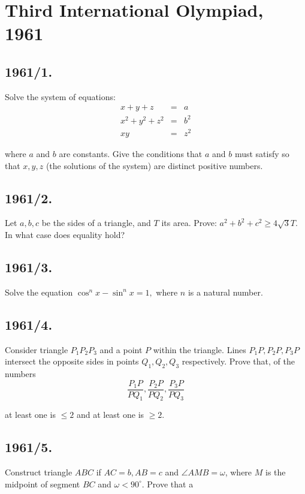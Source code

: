 \documentclass[12pt,thmsa]{article}
\begin{document}
\section{Third International Olympiad, 1961}

\subsection{1961/1.}

Solve the system of equations:
\begin{eqnarray*}
x+y+z &=&a \\
x^{2}+y^{2}+z^{2} &=&b^{2} \\
xy &=&z^{2}
\end{eqnarray*}

where $a$ and $b$ are constants. Give the conditions that $a$ and $b$ must
satisfy so that $x,y,z$ (the solutions of the system) are distinct positive
numbers.

\subsection{1961/2. }

Let $a,b,c$ be the sides of a triangle, and $T$ its area. Prove: $%
a^{2}+b^{2}+c^{2}\geq 4\sqrt{3}T.$ In what case does equality hold?

\subsection{1961/3.}

Solve the equation $\cos ^{n}x-\sin ^{n}x=1,$ where $n$ is a natural number.

\subsection{1961/4.}

Consider triangle $P_{1}P_{2}P_{3}$ and a point $P$ within the triangle.
Lines $P_{1}P,P_{2}P,P_{3}P$ intersect the opposite sides in points $%
Q_{1},Q_{2},Q_{3}$ respectively. Prove that, of the numbers
\[
\frac{P_{1}P}{PQ_{1}},\frac{P_{2}P}{PQ_{2}},\frac{P_{3}P}{PQ_{3}}
\]

at least one is $\leq 2$ and at least one is $\geq 2$.

\subsection{1961/5.}

Construct triangle $ABC$ if $AC=b,AB=c$ and $\angle AMB=\omega $, where $M$
is the midpoint of segment $BC$ and $\omega <90^{\circ }$. Prove that a
\end{document}
